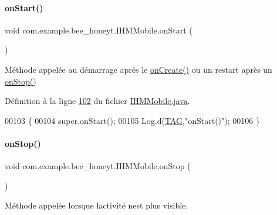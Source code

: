 \paragraph{\texorpdfstring{on\+Start()}{onStart()}}
{\footnotesize\ttfamily void com.\+example.\+bee\+\_\+honeyt.\+I\+H\+M\+Mobile.\+on\+Start (\begin{DoxyParamCaption}{ }\end{DoxyParamCaption})\hspace{0.3cm}{\ttfamily [protected]}}



Méthode appelée au démarrage après le \hyperlink{classcom_1_1example_1_1bee__honeyt_1_1_i_h_m_mobile_af487b0250bfc0e873fe3a4f495c3ef5e}{on\+Create()} ou un restart après un \hyperlink{classcom_1_1example_1_1bee__honeyt_1_1_i_h_m_mobile_ad341d4dd8d326f2ecdca7a5447c3f8a4}{on\+Stop()} 



Définition à la ligne \hyperlink{_i_h_m_mobile_8java_source_l00102}{102} du fichier \hyperlink{_i_h_m_mobile_8java_source}{I\+H\+M\+Mobile.\+java}.


\begin{DoxyCode}
00103     \{
00104         super.onStart();
00105         Log.d(\hyperlink{classcom_1_1example_1_1bee__honeyt_1_1_i_h_m_mobile_a366987bf9bb2ed1010b2f967d4efa263}{TAG},\textcolor{stringliteral}{"onStart()"});
00106     \}
\end{DoxyCode}
\mbox{\label{classcom_1_1example_1_1bee__honeyt_1_1_i_h_m_mobile_ad341d4dd8d326f2ecdca7a5447c3f8a4}} 
\paragraph{\texorpdfstring{on\+Stop()}{onStop()}}
{\footnotesize\ttfamily void com.\+example.\+bee\+\_\+honeyt.\+I\+H\+M\+Mobile.\+on\+Stop (\begin{DoxyParamCaption}{ }\end{DoxyParamCaption})\hspace{0.3cm}{\ttfamily [protected]}}



Méthode appelée lorsque l\textquotesingle{}activité n\textquotesingle{}est plus visible. 




